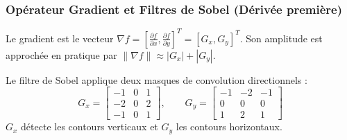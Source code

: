 \subsubsection{Opérateur Gradient et Filtres de Sobel (Dérivée première)}

Le gradient est le vecteur $\nabla f = [\frac{\partial f}{\partial x}, \frac{\partial f}{\partial y}]^T = [G_x, G_y]^T$. Son amplitude est approchée en pratique par $\|\nabla f\| \approx |G_x| + |G_y|$.

\begin{definition}
    Le filtre de Sobel applique deux masques de convolution directionnels :
    \begin{equation}
        G_x = \begin{bmatrix} -1 & 0 & 1 \\ -2 & 0 & 2 \\ -1 & 0 & 1 \end{bmatrix}, \qquad
        G_y = \begin{bmatrix} -1 & -2 & -1 \\ 0 & 0 & 0 \\ 1 & 2 & 1 \end{bmatrix}
    \end{equation}
    $G_x$ détecte les contours verticaux et $G_y$ les contours horizontaux.
\end{definition}